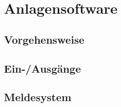 

\chapter{Anlagensoftware}
\label{chap:software}

\section{Vorgehensweise}

\section{Ein-/Ausgänge}

\section{Meldesystem}